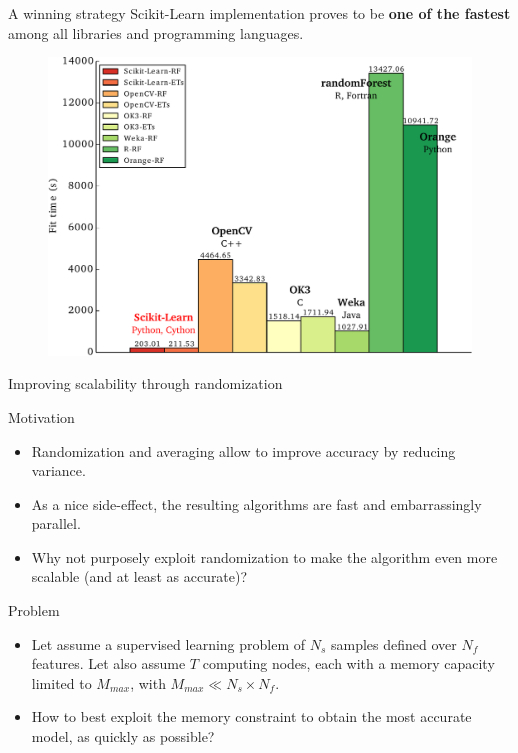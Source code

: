 \documentclass{beamer}
\begin{document}
\begin{frame}{A winning strategy}
Scikit-Learn implementation proves to be {\bf one of the fastest} among all libraries and programming languages.
  \begin{figure}
  \includegraphics[scale=0.5]{./figures/bench.pdf}
  \end{figure}
\end{frame}

\begin{frame}{Improving scalability through randomization}

\begin{block}{Motivation}
\begin{itemize}
\item Randomization and averaging allow to improve accuracy by reducing variance.
\item As a nice side-effect, the resulting algorithms are fast and
  embarrassingly parallel.
\item Why not purposely exploit randomization to make the algorithm
  even more scalable (and at least as accurate)?
\end{itemize}
\end{block}

\begin{block}{Problem}
\begin{itemize}
\item Let assume a supervised learning problem of $N_s$ samples defined over $N_f$ features.
Let also assume $T$ computing nodes, each with a
  memory capacity limited to $M_{max}$, with $M_{max}\ll N_s \times N_f$.
\item How to best exploit the memory constraint to obtain the most accurate model, as quickly as possible?
\end{itemize}
\end{block}

\end{frame}
\end{document}

